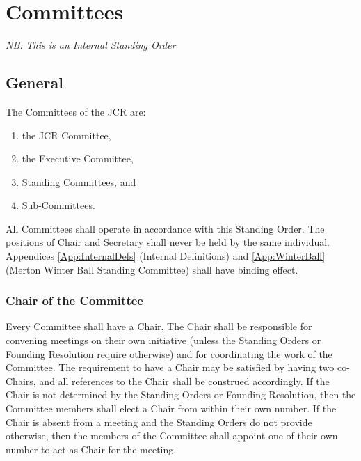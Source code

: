 \chapter{Committees} \label{ch:committees}
\textit{NB: This is an Internal Standing Order}
\section{General}
\npara The Committees of the JCR are:
\begin{enumerate}
	\item the JCR Committee,
	\item the Executive Committee,
	\item Standing Committees, and
	\item Sub-Committees.
\end{enumerate}
\npara All Committees shall operate in accordance with this Standing Order.
\npara The positions of Chair and Secretary shall never be held by the same individual.
\npara Appendices \ref{App:InternalDefs} (Internal Definitions) and \ref{App:WinterBall} (Merton Winter Ball Standing Committee) shall have binding effect.
\subsection{Chair of the Committee}
\npara Every Committee shall have a Chair.
The Chair shall be responsible for convening meetings on their own initiative (unless the Standing Orders or Founding Resolution require otherwise) and for coordinating the work of the Committee.
\npara The requirement to have a Chair may be satisfied by having two co-Chairs, and all references to the Chair shall be construed accordingly.
\npara If the Chair is not determined by the Standing Orders or Founding Resolution, then the Committee members shall elect a Chair from within their own number.
\npara If the Chair is absent from a meeting and the Standing Orders do not provide otherwise, then the members of the Committee shall appoint one of their own number to act as Chair for the meeting.

